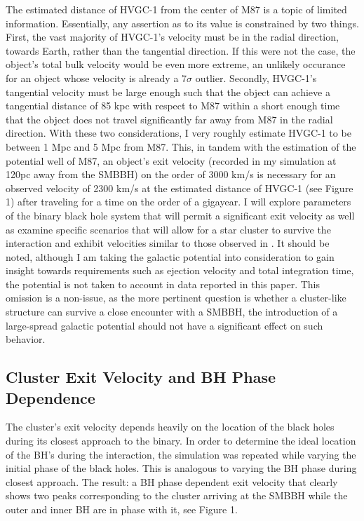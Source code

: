 \documentclass{aastex62}
\begin{document}
The estimated distance of HVGC-1 from the center of M87 is a topic of limited information. Essentially, any assertion as to its value is constrained by two things. First, the vast majority of HVGC-1's velocity must be in the radial direction, towards Earth, rather than the tangential direction. If this were not the case, the object's total bulk velocity would be even more extreme, an unlikely occurance for an object whose velocity is already a 7$\sigma$ outlier. Secondly, HVGC-1's tangential velocity must be large enough such that the object can achieve a tangential distance of 85 kpc with respect to M87 within a short enough time that the object does not travel significantly far away from M87 in the radial direction. With these two considerations, I very roughly estimate HVGC-1 to be between 1 Mpc and 5 Mpc from M87. This, in tandem with the estimation of the potential well of M87, an object's exit velocity (recorded in my simulation at 120pc away from the SMBBH) on the order of 3000 km/s is necessary for an observed velocity of 2300 km/s at the estimated distance of HVGC-1 (see Figure 1) after traveling for a time on the order of a gigayear. I will explore parameters of the binary black hole system that will permit a significant exit velocity as well as examine specific scenarios that will allow for a star cluster to survive the interaction and exhibit velocities similar to those observed in \citet{cald14}. It should be noted, although I am taking the galactic potential into consideration to gain insight towards requirements such as ejection velocity and total integration time, the potential is not taken to account in data reported in this paper. This omission is a non-issue, as the more pertinent question is whether a cluster-like structure can survive a close encounter with a SMBBH, the introduction of a large-spread galactic potential should not have a significant effect on such behavior.
\subsection{Cluster Exit Velocity and BH Phase Dependence}
The cluster's exit velocity depends heavily on the location of the black holes during its closest approach to the binary. In order to determine the ideal location of the BH's during the interaction, the simulation was repeated while varying the initial phase of the black holes. This is analogous to varying the BH phase during closest approach. The result: a BH phase dependent exit velocity that clearly shows two peaks corresponding to the cluster arriving at the SMBBH while the outer and inner BH are in phase with it, see Figure 1.
\end{document}
